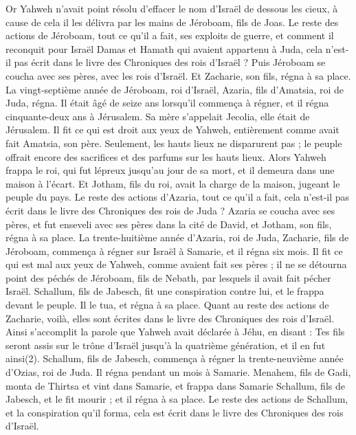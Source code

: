 \begin{multicols}{2}
Or Yahweh n’avait point résolu d’effacer le nom d’Israël de dessous les cieux, à cause de cela il les délivra par les mains de Jéroboam, fils de Joas.
Le reste des actions de Jéroboam, tout ce qu’il a fait, ses exploits de guerre, et comment il reconquit pour Israël Damas et Hamath qui avaient appartenu à Juda, cela n’est-il pas écrit dans le livre des Chroniques des rois d’Israël ?
Puis Jéroboam se coucha avec ses pères, avec les rois d’Israël. Et Zacharie, son fils, régna à sa place.
\VerseOne{}La vingt-septième année de Jéroboam, roi d’Israël, Azaria\FTNT{}, fils d’Amatsia, roi de Juda, régna.
Il était âgé de seize ans lorsqu’il commença à régner, et il régna cinquante-deux ans à Jérusalem. Sa mère s’appelait Jecolia, elle était de Jérusalem.
Il fit ce qui est droit aux yeux de Yahweh, entièrement comme avait fait Amatsia, son père.
Seulement, les hauts lieux ne disparurent pas ; le peuple offrait encore des sacrifices et des parfums sur les hauts lieux.
Alors Yahweh frappa le roi, qui fut lépreux jusqu’au jour de sa mort, et il demeura dans une maison à l’écart. Et Jotham, fils du roi, avait la charge de la maison, jugeant le peuple du pays.
Le reste des actions d’Azaria, tout ce qu’il a fait, cela n’est-il pas écrit dans le livre des Chroniques des rois de Juda ?
Azaria se coucha avec ses pères, et fut enseveli avec ses pères dans la cité de David, et Jotham, son fils, régna à sa place.
La trente-huitième année d’Azaria, roi de Juda, Zacharie, fils de Jéroboam, commença à régner sur Israël à Samarie, et il régna six mois.
Il fit ce qui est mal aux yeux de Yahweh, comme avaient fait ses pères ; il ne se détourna point des péchés de Jéroboam, fils de Nebath, par lesquels il avait fait pécher Israël.
Schallum, fils de Jabesch, fit une conspiration contre lui, et le frappa devant le peuple. Il le tua, et régna à sa place.
Quant au reste des actions de Zacharie, voilà, elles sont écrites dans le livre des Chroniques des rois d’Israël.
Ainsi s’accomplit la parole que Yahweh avait déclarée à Jéhu, en disant : Tes fils seront assis sur le trône d’Israël jusqu’à la quatrième génération, et il en fut ainsi(2).
Schallum, fils de Jabesch, commença à régner la trente-neuvième année d’Ozias, roi de Juda. Il régna pendant un mois à Samarie.
Menahem, fils de Gadi, monta de Thirtsa et vint dans Samarie, et frappa dans Samarie Schallum, fils de Jabesch, et le fit mourir ; et il régna à sa place.
Le reste des actions de Schallum, et la conspiration qu’il forma, cela est écrit dans le livre des Chroniques des rois d’Israël.

\end{multicols}
